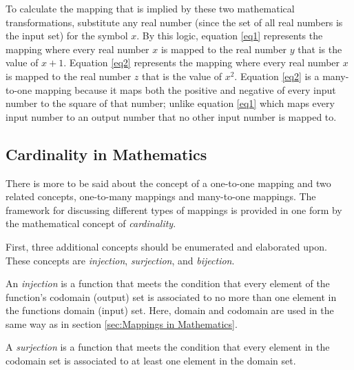 To calculate the mapping that is implied by these two mathematical transformations, substitute any real number (since the set of all real numbers is the input set) for the symbol \begin{math}x\end{math}. By this logic, equation \ref{eq1} represents the mapping where every real number \begin{math}x\end{math} is mapped to the real number \begin{math}y\end{math} that is the value of \begin{math}x + 1\end{math}. Equation \ref{eq2} represents the mapping where every real number \begin{math}x\end{math} is mapped to the real number \begin{math}z\end{math} that is the value of \begin{math}x^{2}\end{math}. Equation \ref{eq2} is a many-to-one mapping because it maps both the positive and negative of every input number to the square of that number; unlike equation \ref{eq1} which maps every input number to an output number that no other input number is mapped to.

\subsection{Cardinality in Mathematics}

There is more to be said about the concept of a one-to-one mapping and two related concepts, one-to-many mappings and many-to-one mappings. The framework for discussing different types of mappings is provided in one form by the mathematical concept of \emph{cardinality}.

First, three additional concepts should be enumerated and elaborated upon. These concepts are \emph{injection}, \emph{surjection}, and \emph{bijection}.

An \emph{injection} is a function that meets the condition that every element of the function's codomain (output) set is associated to no more than one element in the functions domain (input) set. Here, domain and codomain are used in the same way as in section \ref{sec:Mappings in Mathematics}.

A \emph{surjection} is a function that meets the condition that every element in the codomain set is associated to at least one element in the domain set.

